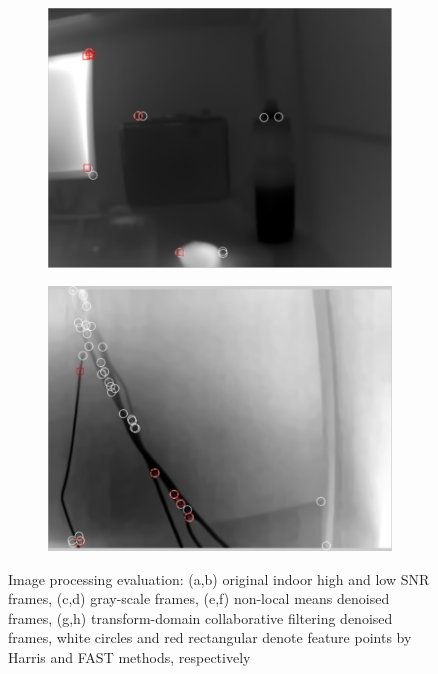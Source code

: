 \begin{figure}
\begin{subfigure}{0.49\columnwidth}
    \includegraphics[width=1.00\textwidth]{media/V_C_highsnrcornerstrans.jpg}
    	\caption{}
		\label{fig:imgprocessing_7}
  \end{subfigure}
	\begin{subfigure}{0.49\columnwidth}
    \centering
    \includegraphics[width=1.00\textwidth]{media/V_C_lowsnrcornerstrans.jpg}
		\caption{}
		\label{fig:imgprocessing_8}
  \end{subfigure}
\caption{Image processing evaluation: (a,b) original indoor high and low SNR frames, (c,d) gray-scale frames, (e,f) non-local means denoised frames, (g,h)  transform-domain collaborative filtering denoised frames, white circles and red rectangular denote feature points by Harris and FAST methods, respectively}
\label{fig:imgprocessing}
\end{figure}


